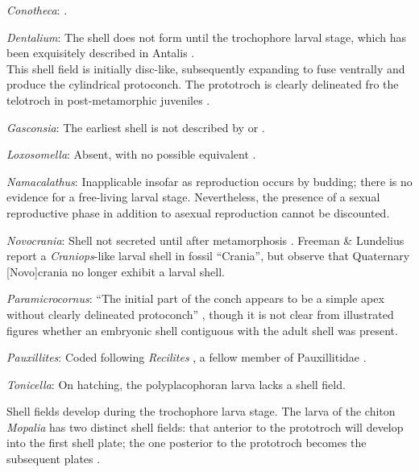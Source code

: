 \documentclass[openany]{book}
\begin{document}
\hypertarget{Conotheca-coding-1}{}
\emph{Conotheca}: \citep{Wrona2003}.

\hypertarget{Dentalium-coding-1}{}
\emph{Dentalium}: The shell does not form until the trochophore larval
stage, which has been exquisitely described in Antalis
\citep{Wanninger2001}.\\
This shell field is initially disc-like, subsequently expanding to fuse
ventrally and produce the cylindrical protoconch. The prototroch is
clearly delineated fro the telotroch in post-metamorphic juveniles
\citep{Wanninger2001}.

\hypertarget{Gasconsia-coding-1}{}
\emph{Gasconsia}: The earliest shell is not described by
\citet{Hanken1985Thetaxonomy} or \citet{Watkins2002Newrecord}.

\hypertarget{Loxosomella-coding-1}{}
\emph{Loxosomella}: Absent, with no possible equivalent
\citep{Nielsen1966}.

\hypertarget{Namacalathus-coding-1}{}
\emph{Namacalathus}: Inapplicable insofar as reproduction occurs by
budding; there is no evidence for a free-living larval stage.
Nevertheless, the presence of a sexual reproductive phase in addition to
asexual reproduction cannot be discounted.

\hypertarget{Novocrania-coding-1}{}
\emph{Novocrania}: Shell not secreted until after metamorphosis
\citep{Popov2010Earliestontogeny}. Freeman \& Lundelius
\citeyearpar{Freeman1999Changesin} report a \emph{Craniops}-like larval
shell in fossil ``Crania'', but observe that Quaternary {[}Novo{]}crania
no longer exhibit a larval shell.

\hypertarget{Paramicrocornus-coding-1}{}
\emph{Paramicrocornus}: ``The initial part of the conch appears to be a
simple apex without clearly delineated protoconch''
\citep{Zhang2018Ahyolithid}, though it is not clear from illustrated
figures whether an embryonic shell contiguous with the adult shell was
present.

\hypertarget{Pauxillites-coding-1}{}
\emph{Pauxillites}: Coded following \emph{Recilites} \citep{Dzik1978}, a
fellow member of Pauxillitidae \citep{Marek1967}.

\hypertarget{Tonicella-coding-1}{}
\emph{Tonicella}: On hatching, the polyplacophoran larva lacks a shell
field.

Shell fields develop during the trochophore larva stage. The larva of
the chiton \emph{Mopalia} has two distinct shell fields: that anterior
to the prototroch will develop into the first shell plate; the one
posterior to the prototroch becomes the subsequent plates
\citep{Wanninger2002C}.
\end{document}
